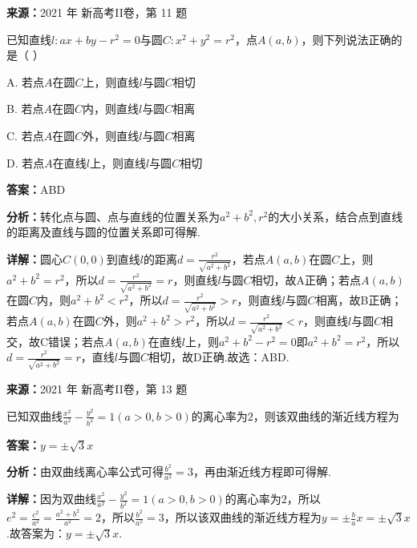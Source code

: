 \begin{question}[points=5]
\textbf{来源：}2021 年 新高考II卷，第 11 题\par
已知直线$l:ax+by-r^2=0$与圆$C:x^2+y^2=r^2$，点$A(a,b)$，则下列说法正确的是（ ）
\begin{choices}
  \item A. 若点$A$在圆$C$上，则直线$l$与圆$C$相切
  \item B. 若点$A$在圆$C$内，则直线$l$与圆$C$相离
  \item C. 若点$A$在圆$C$外，则直线$l$与圆$C$相离
  \item D. 若点$A$在直线$l$上，则直线$l$与圆$C$相切
\end{choices}
\begin{solution}
\textbf{答案：}ABD

\textbf{分析：}转化点与圆、点与直线的位置关系为$a^2+b^2,r^2$的大小关系，结合点到直线的距离及直线与圆的位置关系即可得解.

\textbf{详解：}圆心$C(0,0)$到直线$l$的距离$d=\frac{r^2}{\sqrt{a^2+b^2}}$，若点$A(a,b)$在圆$C$上，则$a^2+b^2=r^2$，所以$d=\frac{r^2}{\sqrt{a^2+b^2}}=r$，则直线$l$与圆$C$相切，故A正确；若点$A(a,b)$在圆$C$内，则$a^2+b^2<r^2$，所以$d=\frac{r^2}{\sqrt{a^2+b^2}}>r$，则直线$l$与圆$C$相离，故B正确；若点$A(a,b)$在圆$C$外，则$a^2+b^2>r^2$，所以$d=\frac{r^2}{\sqrt{a^2+b^2}}<r$，则直线$l$与圆$C$相交，故C错误；若点$A(a,b)$在直线$l$上，则$a^2+b^2-r^2=0$即$a^2+b^2=r^2$，所以$d=\frac{r^2}{\sqrt{a^2+b^2}}=r$，直线$l$与圆$C$相切，故D正确.故选：ABD.
\end{solution}
\end{question}

\begin{question}[points=5]
\textbf{来源：}2021 年 新高考II卷，第 13 题\par
已知双曲线$\frac{x^2}{a^2}-\frac{y^2}{b^2}=1(a>0,b>0)$的离心率为$2$，则该双曲线的渐近线方程为
\fillin[{$y=\pm\sqrt{3}x$}]
\begin{solution}
\textbf{答案：}$y=\pm\sqrt{3}x$

\textbf{分析：}由双曲线离心率公式可得$\frac{b^2}{a^2}=3$，再由渐近线方程即可得解.

\textbf{详解：}因为双曲线$\frac{x^2}{a^2}-\frac{y^2}{b^2}=1(a>0,b>0)$的离心率为$2$，所以$e^2=\frac{c^2}{a^2}=\frac{a^2+b^2}{a^2}=2$，所以$\frac{b^2}{a^2}=3$，所以该双曲线的渐近线方程为$y=\pm\frac{b}{a}x=\pm\sqrt{3}x$.故答案为：$y=\pm\sqrt{3}x$.
\end{solution}
\end{question}

